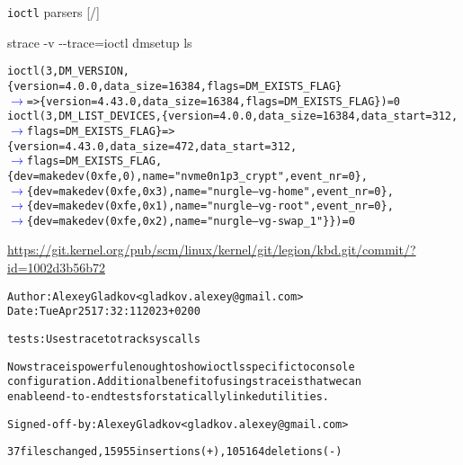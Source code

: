 \documentclass[unicode,aspectratio=169,xcolor={table,dvipsnames,usernames}]{beamer}
\newcommand{\symlinecont}{\textcolor{blue}{\(\longrightarrow\)}}
\begin{document}
\begin{frame}[fragile]{\texttt{ioctl} parsers \hfill [\insertframenumber/\inserttotalframenumber]}
\begin{block}{\scriptsize strace -v -{}-trace=ioctl dmsetup ls}
\scriptsize
\begin{alltt}
ioctl(3, DM_VERSION, \{version=4.0.0, data_size=16384, flags=DM_EXISTS_FLAG\}
\symlinecont => \{version=4.43.0, data_size=16384, flags=DM_EXISTS_FLAG\}) = 0
ioctl(3, DM_LIST_DEVICES, \{version=4.0.0, data_size=16384, data_start=312,
\symlinecont flags=DM_EXISTS_FLAG\} => \{version=4.43.0, data_size=472, data_start=312,
\symlinecont flags=DM_EXISTS_FLAG, \{dev=makedev(0xfe, 0), name="nvme0n1p3_crypt", event_nr=0\},
\symlinecont \{dev=makedev(0xfe, 0x3), name="nurgle--vg-home", event_nr=0\},
\symlinecont \{dev=makedev(0xfe, 0x1), name="nurgle--vg-root", event_nr=0\},
\symlinecont \{dev=makedev(0xfe, 0x2), name="nurgle--vg-swap_1"\}\}) = 0
\end{alltt}
\end{block}
\begin{block}{\scriptsize\url{https://git.kernel.org/pub/scm/linux/kernel/git/legion/kbd.git/commit/?id=1002d3b56b72}}
\scriptsize
\begin{alltt}
Author: Alexey Gladkov <gladkov.alexey@gmail.com>
Date:   Tue Apr 25 17:32:11 2023 +0200
\end{alltt}
\vspace{-3ex}
\begin{alltt}
    tests: Use strace to track syscalls
\end{alltt}
\vspace{-3ex}
\begin{alltt}
    Now strace is powerful enough to show ioctls specific to console
    configuration. Additional benefit of using strace is that we can
    enable end-to-end tests for statically linked utilities.
\end{alltt}
\vspace{-3ex}
\begin{alltt}
    Signed-off-by: Alexey Gladkov <gladkov.alexey@gmail.com>
\end{alltt}
\vspace{-3ex}
\begin{alltt}
 37 files changed, 15955 insertions(+), 105164 deletions(-)
\end{alltt}
\end{block}
\end{frame}
\end{document}
